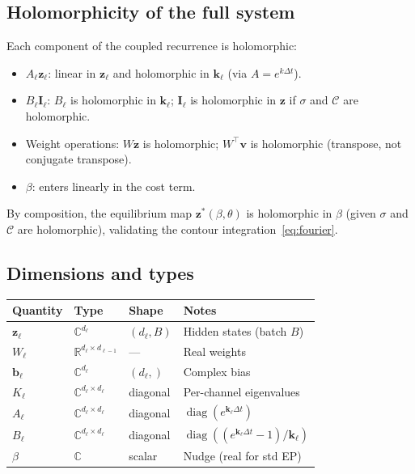 \documentclass[11pt]{article}
\newcommand{\R}{\mathbb{R}}
\newcommand{\C}{\mathbb{C}}
\newcommand{\dt}{\Delta t}
\theoremstyle{definition}
\DeclareMathOperator{\diag}{diag}
\begin{document}
\subsection{Holomorphicity of the full system}

Each component of the coupled recurrence is holomorphic:
\begin{itemize}
\item $A_\ell\bm{z}_\ell$: linear in $\bm{z}_\ell$ and
  holomorphic in $\bm{k}_\ell$ (via $A=e^{k\dt}$).
\item $B_\ell\bm{I}_\ell$: $B_\ell$ is holomorphic in $\bm{k}_\ell$;
  $\bm{I}_\ell$ is holomorphic in $\bm{z}$ if $\sigma$ and
  $\mathcal{C}$ are holomorphic.
\item Weight operations: $W\bm{z}$ is holomorphic; $W^{\!\top}\bm{v}$
  is holomorphic (transpose, not conjugate transpose).
\item $\beta$: enters linearly in the cost term.
\end{itemize}
By composition, the equilibrium map
$\bm{z}^*(\beta,\theta)$ is holomorphic in $\beta$ (given $\sigma$
and $\mathcal{C}$ are holomorphic), validating the contour
integration~\eqref{eq:fourier}.

\subsection{Dimensions and types}

\begin{center}
\begin{tabular}{llll}
\toprule
\textbf{Quantity} & \textbf{Type} & \textbf{Shape} & \textbf{Notes} \\
\midrule
$\bm{z}_\ell$ & $\C^{d_\ell}$ & $(d_\ell, B)$ & Hidden states (batch $B$) \\
$W_\ell$ & $\R^{d_\ell\times d_{\ell-1}}$ & --- & Real weights \\
$\bm{b}_\ell$ & $\C^{d_\ell}$ & $(d_\ell,)$ & Complex bias \\
$K_\ell$ & $\C^{d_\ell\times d_\ell}$ & diagonal & Per-channel eigenvalues \\
$A_\ell$ & $\C^{d_\ell\times d_\ell}$ & diagonal & $\diag(e^{\bm{k}_\ell\dt})$ \\
$B_\ell$ & $\C^{d_\ell\times d_\ell}$ & diagonal & $\diag((e^{\bm{k}_\ell\dt}-1)/\bm{k}_\ell)$ \\
$\beta$ & $\C$ & scalar & Nudge (real for std EP) \\
\bottomrule
\end{tabular}
\end{center}
\end{document}
